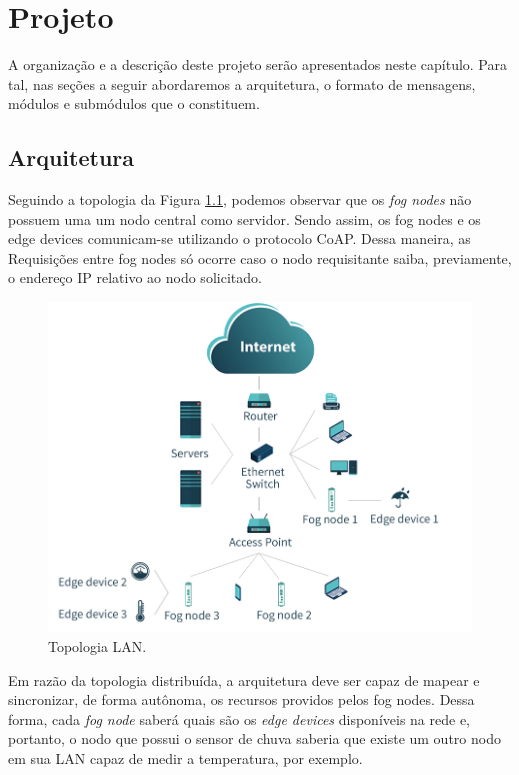 \chapter{\label{chap:chap3} Projeto}



A organização e a descrição deste projeto serão apresentados neste capítulo.
Para tal, nas seções a seguir abordaremos a arquitetura, o formato de mensagens, módulos e submódulos que o constituem.

\section { Arquitetura }

Seguindo a topologia da Figura \ref{fig:fig14}, podemos observar que os \textit{fog nodes} não possuem uma um nodo central como servidor.
Sendo assim, os fog nodes e os edge devices comunicam-se utilizando o protocolo CoAP.
Dessa maneira, as Requisições entre fog nodes só ocorre caso o nodo requisitante saiba, previamente, o endereço IP relativo ao nodo solicitado.

\begin{figure}[H]
    \centering\includegraphics[width=.8\textwidth]{fig14.png}
    \caption [Topologia LAN]
    {\label{fig:fig14} Topologia LAN.}
\end{figure}

Em razão da topologia distribuída, a arquitetura deve ser capaz de mapear e sincronizar, de forma autônoma, os recursos providos pelos fog nodes.
Dessa forma, cada \textit{fog node} saberá quais são os \textit{edge devices} disponíveis na rede e, portanto,
o nodo que possui o sensor de chuva saberia que existe um outro nodo em sua LAN capaz de medir a temperatura, por exemplo.

